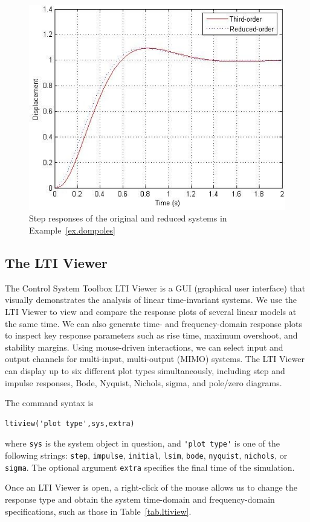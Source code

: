 \begin{figure}[bht]
\centering
\includegraphics[width=.9\textwidth]{dompoles}
\caption{ \footnotesize
        Step responses of the original and reduced systems in Example~\ref{ex.dompoles}
        \label{fig.ex.dompoles}
        }
\end{figure}

\subsection{The LTI Viewer}
The Control System Toolbox LTI Viewer is a GUI (graphical user interface) that visually demonstrates the analysis of linear time-invariant systems.  We use the LTI Viewer to view and compare the response plots of several linear models at the same time.  We can also generate time- and frequency-domain response plots to inspect key response parameters such as rise time, maximum overshoot, and stability margins.  Using mouse-driven interactions, we can select input and output channels for multi-input, multi-output (MIMO) systems.  The LTI Viewer can display up to six different plot types simultaneously, including step and impulse responses, Bode, Nyquist, Nichols, sigma, and pole/zero diagrams.
\par
The command syntax is
\begin{verbatim}
ltiview('plot type',sys,extra)
\end{verbatim}
where \verb=sys= is the system object in question, and \verb='plot type'= is one of the following strings: \verb=step=, \verb=impulse=, \verb=initial=, \verb=lsim=, \verb=bode=, \verb=nyquist=, \verb=nichols=, or \verb=sigma=.  The optional argument \verb=extra= specifies the final time of the simulation.
\par
Once an LTI Viewer is open, a right-click of the mouse allows us to change the response type and obtain the system time-domain and frequency-domain specifications, such as those in Table~\ref{tab.ltiview}.

